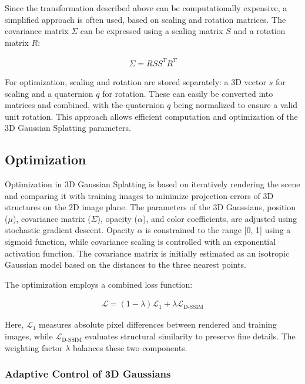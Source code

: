 Since the transformation described above can be computationally expensive, a simplified approach is often used, based on scaling and rotation matrices.
The covariance matrix \(\Sigma\) can be expressed using a scaling matrix \(S\) and a rotation matrix \(R\):

\begin{align}
\Sigma = R S S^T R^T
\label{eq:calc_sigma}
\end{align}

For optimization, scaling and rotation are stored separately: a 3D vector \(s\) for scaling and a quaternion \(q\) for rotation.
These can easily be converted into matrices and combined, with the quaternion \(q\) being normalized to ensure a valid unit rotation.
This approach allows efficient computation and optimization of the 3D Gaussian Splatting parameters.


\subsection{Optimization}

Optimization in 3D Gaussian Splatting is based on iteratively rendering the scene and comparing it with training images to minimize projection errors of 3D structures on the 2D image plane.
The parameters of the 3D Gaussians, position ($\mu$), covariance matrix ($\Sigma$), opacity ($\alpha$), and color coefficients, are adjusted using stochastic gradient descent.
Opacity \(\alpha\) is constrained to the range [0, 1] using a sigmoid function, while covariance scaling is controlled with an exponential activation function.
The covariance matrix is initially estimated as an isotropic Gaussian model based on the distances to the three nearest points.

The optimization employs a combined loss function:

\begin{align}
\mathcal{L} = (1 - \lambda) \mathcal{L}_1 + \lambda \mathcal{L}_{\text{D-SSIM}}
\label{eq:loss_GS}
\end{align}

Here, \(\mathcal{L}_1\) measures absolute pixel differences between rendered and training images, while \(\mathcal{L}_{\text{D-SSIM}}\) evaluates structural similarity to preserve fine details.
The weighting factor \(\lambda\) balances these two components.

\subsubsection{Adaptive Control of 3D Gaussians}

